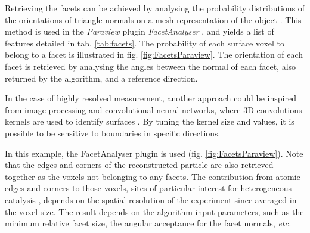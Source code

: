 Retrieving the facets can be achieved by analysing the probability distributions of the orientations of triangle normals on a mesh representation of the object \parencite{Grothausmann2012}.
This method is used in the \textit{Paraview} plugin \textit{FacetAnalyser} \parencite{Grothausmann2015}, and yields a list of features detailed in tab. \ref{tab:facets}.
The probability of each surface voxel to belong to a facet is illustrated in fig. \ref{fig:FacetsParaview}.
The orientation of each facet is retrieved by analysing the angles between the normal of each facet, also returned by the algorithm, and a reference direction.

In the case of highly resolved measurement, another approach could be inspired from image processing and convolutional neural networks, where 3D convolutions kernels are used to identify surfaces \parencite{RaschkaMirjalili2019}.
By tuning the kernel size and values, it is possible to be sensitive to boundaries in specific directions.

In this example, the FacetAnalyser plugin is used (fig. \ref{fig:FacetsParaview}).
Note that the edges and corners of the reconstructed particle are also retrieved together as the voxels not belonging to any facets.
The contribution from atomic edges and corners to those voxels, sites of particular interest for heterogeneous catalysis \parencite{Taylor1925}, depends on the spatial resolution of the experiment since averaged in the voxel size.
The result depends on the algorithm input parameters, such as the minimum relative facet size, the angular acceptance for the facet normals, \textit{etc.}